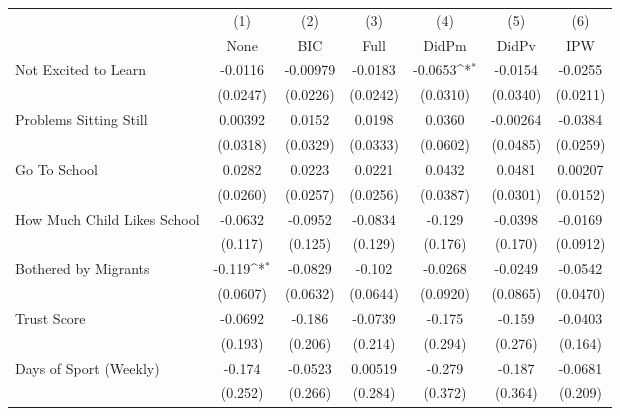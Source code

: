 {
\def\sym#1{\ifmmode^{#1}\else\(^{#1}\)\fi}
\begin{tabular}{l*{6}{c}}
\toprule
            &\multicolumn{1}{c}{(1)}&\multicolumn{1}{c}{(2)}&\multicolumn{1}{c}{(3)}&\multicolumn{1}{c}{(4)}&\multicolumn{1}{c}{(5)}&\multicolumn{1}{c}{(6)}\\
            &\multicolumn{1}{c}{None}&\multicolumn{1}{c}{BIC}&\multicolumn{1}{c}{Full}&\multicolumn{1}{c}{DidPm}&\multicolumn{1}{c}{DidPv}&\multicolumn{1}{c}{IPW}\\
\midrule
Not Excited to Learn&     -0.0116         &    -0.00979         &     -0.0183         &     -0.0653\sym{*}  &     -0.0154         &     -0.0255         \\
            &    (0.0247)         &    (0.0226)         &    (0.0242)         &    (0.0310)         &    (0.0340)         &    (0.0211)         \\
\addlinespace
Problems Sitting Still&     0.00392         &      0.0152         &      0.0198         &      0.0360         &    -0.00264         &     -0.0384         \\
            &    (0.0318)         &    (0.0329)         &    (0.0333)         &    (0.0602)         &    (0.0485)         &    (0.0259)         \\
\addlinespace
Go To School&      0.0282         &      0.0223         &      0.0221         &      0.0432         &      0.0481         &     0.00207         \\
            &    (0.0260)         &    (0.0257)         &    (0.0256)         &    (0.0387)         &    (0.0301)         &    (0.0152)         \\
\addlinespace
How Much Child Likes School&     -0.0632         &     -0.0952         &     -0.0834         &      -0.129         &     -0.0398         &     -0.0169         \\
            &     (0.117)         &     (0.125)         &     (0.129)         &     (0.176)         &     (0.170)         &    (0.0912)         \\
\addlinespace
Bothered by Migrants&      -0.119\sym{*}  &     -0.0829         &      -0.102         &     -0.0268         &     -0.0249         &     -0.0542         \\
            &    (0.0607)         &    (0.0632)         &    (0.0644)         &    (0.0920)         &    (0.0865)         &    (0.0470)         \\
\addlinespace
Trust Score &     -0.0692         &      -0.186         &     -0.0739         &      -0.175         &      -0.159         &     -0.0403         \\
            &     (0.193)         &     (0.206)         &     (0.214)         &     (0.294)         &     (0.276)         &     (0.164)         \\
\addlinespace
Days of Sport (Weekly)&      -0.174         &     -0.0523         &     0.00519         &      -0.279         &      -0.187         &     -0.0681         \\
            &     (0.252)         &     (0.266)         &     (0.284)         &     (0.372)         &     (0.364)         &     (0.209)         \\
\bottomrule
\end{tabular}
}
